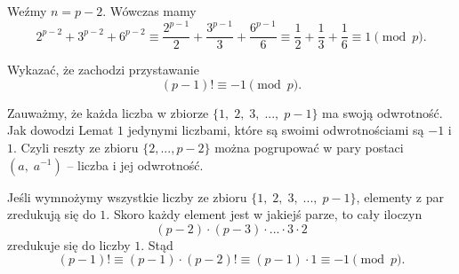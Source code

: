 \noindent
Weźmy $n = p-2$. Wówczas mamy
\[ 
	2^{p-2} + 3^{p-2} + 6^{p-2} \equiv \frac{2^{p-1}}{2} + \frac{3^{p-1}}{3} + \frac{6^{p-1}}{6} \equiv \frac{1}{2} + \frac{1}{3} + \frac{1}{6} \equiv 1 \pmod{p}.
\]

\begin{problem}{4}
	Wykazać, że zachodzi przystawanie
	\[
		(p - 1)! \equiv -1 \pmod{p}.
	\]
\end{problem}

\noindent
Zauważmy, że każda liczba w zbiorze $\{1,\; 2,\; 3,\; ...,\; p-1\}$ ma swoją odwrotność. Jak dowodzi Lemat $1$ jedynymi liczbami, które są swoimi odwrotnościami są $-1$ i $1$. Czyli reszty ze zbioru $\{2, ..., p-2\}$ można pogrupować w pary postaci $(a,\; a^{-1})$ -- liczba i jej odwrotność. 

\vspace{10px}
\noindent
Jeśli wymnożymy wszystkie liczby ze zbioru $\{1,\; 2,\; 3,\; ...,\; p-1\}$, elementy z par zredukują się do $1$. Skoro każdy element jest w jakiejś parze, to cały iloczyn 
\[
	(p-2)\cdot (p-3) \cdot ... \cdot 3 \cdot 2
\] 
zredukuje się do liczby $1$. Stąd
\[
	(p-1)! \equiv (p-1) \cdot (p-2)! \equiv (p - 1) \cdot 1 \equiv -1 \pmod{p}.
\]
